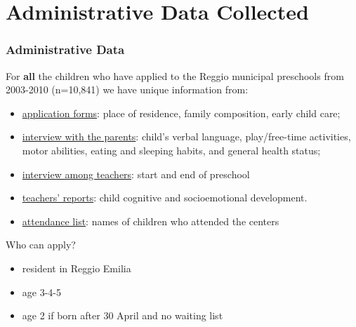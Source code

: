 \documentclass[xcolor=table]{beamer}
\begin{document}
\section{Administrative Data Collected}
\begin{frame}
\frametitle{Administrative Data}
For \textbf{all} the children who have applied to the Reggio municipal preschools from 2003-2010 (n=10,841) we have unique information from:
\begin{itemize}
\item\underline{application forms}: place of residence, family composition, early child care;
\item\underline{interview with the parents}: child's verbal language, play/free-time activities, motor abilities, eating and sleeping habits, and general health status;
\item\underline{interview among teachers}: start and end of preschool
\item\underline{teachers' reports}: child cognitive and socioemotional development.
\item\underline{attendance list}: names of children who attended the centers
\end{itemize}

\vspace{2ex}
Who can apply?
\begin{itemize}
	\item resident in Reggio Emilia
	\item age 3-4-5
	\item age 2 if born after 30 April and no waiting list
\end{itemize}

%
\end{frame}
\end{document}
